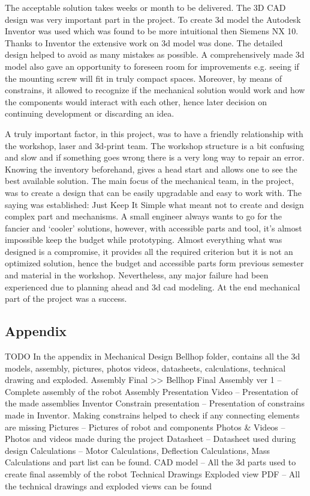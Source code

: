 \documentclass[11pt]{article}
\begin{document}
The acceptable solution takes weeks or month to be delivered.  The 3D CAD design was very important part in the project. To create 3d model the Autodesk Inventor was used which was found to be more intuitional then Siemens NX 10. Thanks to Inventor the extensive work on 3d model was done. The detailed design helped to avoid as many mistakes as possible. A comprehensively made 3d model also gave an opportunity to foreseen room for improvements e.g. seeing if the mounting screw will fit in truly compact spaces. Moreover, by means of constrains, it allowed to recognize if the mechanical solution would work and how the components would interact with each other, hence later decision on continuing development or discarding an idea.


A truly important factor, in this project, was to have a friendly relationship with the workshop, laser and 3d-print team. The workshop structure is a bit confusing and slow and if something goes wrong there is a very long way to repair an error. Knowing the inventory beforehand, gives a head start and allows one to see the best available solution. The main focus of the mechanical team, in the project, was to create a design that can be easily upgradable and easy to work with. The saying was established: Just Keep It Simple what meant not to create and design complex part and mechanisms. A small engineer always wants to go for the fancier and ‘cooler’ solutions, however, with accessible parts and tool, it’s almost impossible keep the budget while prototyping. Almost everything what was designed is a compromise, it provides all the required criterion but it is not an optimized solution, hence the budget and accessible parts form previous semester and material in the workshop. Nevertheless, any major failure had been experienced due to planning ahead and 3d cad modeling. At the end mechanical part of the project was a success.  


\subsection*{Appendix}
TODO
In the appendix in Mechanical Design Bellhop folder, contains all the 3d models, assembly, pictures, photos videos, datasheets, calculations, technical drawing and exploded. 
Assembly Final >> Bellhop Final Assembly ver 1 – Complete assembly of the robot
Assembly Presentation Video – Presentation of the made assemblies 
Inventor Constrain presentation – Presentation of constrains made in Inventor. Making constrains helped to check if any connecting elements are missing  
Pictures – Pictures of robot and components 
Photos \& Videos – Photos and videos made during the project
Datasheet – Datasheet used during design       
Calculations – Motor Calculations, Deflection Calculations, Mass Calculations and part list can be found. 
CAD model – All the 3d parts used to create final assembly of the robot
Technical Drawings Exploded view PDF – All the technical drawings and exploded views can be found
\end{document}
